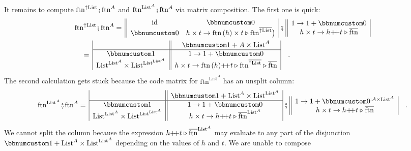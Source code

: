 It remains to compute $\text{ftn}^{\uparrow\text{List}}\bef\text{ftn}^{A}$
and $\text{ftn}^{\text{List}^{A}}\bef\text{ftn}^{A}$ via matrix composition.
The first one is quick:
\begin{align*}
 & \text{ftn}^{\uparrow\text{List}}\bef\text{ftn}^{A}=\,\begin{array}{||cc|}
\text{id} & \bbnum 0\\
\bbnum 0 & h\times t\rightarrow\text{ftn}\,(h)\times t\triangleright\text{ftn}^{\overline{\uparrow\text{List}}}\big)
\end{array}\,\bef\,\begin{array}{||c|}
1\rightarrow1+\bbnum 0\\
h\times t\rightarrow h\pplus t\triangleright\overline{\text{ftn}}
\end{array}\\
 & \quad=\,\begin{array}{|c||c|}
 & \bbnum 1+A\times\text{List}^{A}\\
\hline \bbnum 1 & 1\rightarrow1+\bbnum 0\\
\text{List}^{\text{List}^{A}}\times\text{List}^{\text{List}^{\text{List}^{A}}} & h\times t\rightarrow\text{ftn}\,(h)\pplus t\triangleright\text{ftn}^{\overline{\uparrow\text{List}}}\triangleright\overline{\text{ftn}}
\end{array}\quad.
\end{align*}
The second calculation gets stuck because the code matrix for $\text{ftn}^{\text{List}^{A}}$
has an unsplit column:
\[
\text{ftn}^{\text{List}^{A}}\bef\text{ftn}^{A}=\,\begin{array}{|c||c|}
 & \bbnum 1+\text{List}^{A}\times\text{List}^{\text{List}^{A}}\\
\hline \bbnum 1 & 1\rightarrow1+\bbnum 0\\
\text{List}^{\text{List}^{A}}\times\text{List}^{\text{List}^{\text{List}^{A}}} & h\times t\rightarrow h\pplus t\triangleright\overline{\text{ftn}}^{\text{List}^{A}}
\end{array}\,\bef\,\begin{array}{||c|}
1\rightarrow1+\bbnum 0^{:A\times\text{List}^{A}}\\
h\times t\rightarrow h\pplus t\triangleright\overline{\text{ftn}}
\end{array}\quad.
\]
We cannot split the column because the expression $h{\displaystyle }{+\negmedspace+} t\triangleright\overline{\text{ftn}}^{\text{List}^{A}}$
may evaluate to any part of the disjunction $\bbnum 1+\text{List}^{A}\times\text{List}^{\text{List}^{A}}$
depending on the values of $h$ and $t$. We are unable to compose
